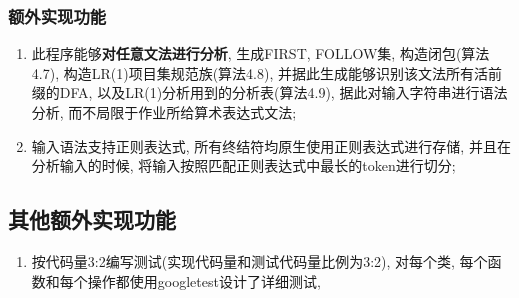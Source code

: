 \subsubsection{额外实现功能}
\begin{enumerate}
	\item 此程序能够\textbf{对任意文法进行分析}, 生成FIRST, FOLLOW集,
		构造闭包(算法4.7), 构造LR(1)项目集规范族(算法4.8),
		并据此生成能够识别该文法所有活前缀的DFA,
		以及LR(1)分析用到的分析表(算法4.9),
		据此对输入字符串进行语法分析, 而不局限于作业所给算术表达式文法;
	\item 输入语法支持正则表达式, 所有终结符均原生使用正则表达式进行存储,
		并且在分析输入的时候, 将输入按照匹配正则表达式中最长的token进行切分;
\end{enumerate}

\subsection{其他额外实现功能}
\begin{enumerate}
	\item 按代码量3:2编写测试(实现代码量和测试代码量比例为3:2), 对每个类,
		每个函数和每个操作都使用googletest设计了详细测试, 
\end{enumerate}
